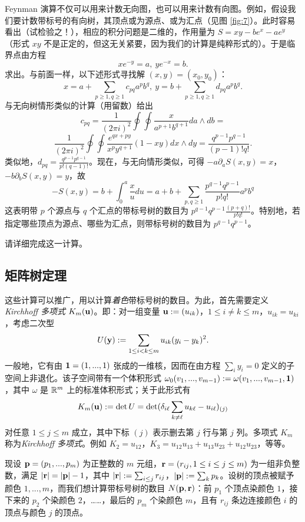 Feynman 演算不仅可以用来计数无向图，也可以用来计数有向图。例如，假设我们要计数带标号的有向树，其顶点或为源点、或为汇点（见图 \ref{fig:7}）。此时容易看出（试检验之！），相应的积分问题是二维的，作用量为 $S=xy-be^x-ae^y$（形式 $xy$ 不是正定的，但这无关紧要，因为我们的计算是纯粹形式的）。于是临界点由方程
$$
xe^{-y}=a,\ ye^{-x}=b.
$$
求出。与前面一样，以下述形式寻找解 $(x,y)=(x_0,y_0)$：
$$
x=a+\sum_{p\ge 1,q\ge 1} c_{pq}a^pb^q,\ y=b+\sum_{p\ge 1,q\ge 1} d_{pq}a^pb^q.
$$
与无向树情形类似的计算（用留数）给出
$$
c_{pq}=\frac{1}{(2\pi i)^2}\oint\oint\frac{x}{a^{p+1}b^{q+1}}da\wedge db=
$$
$$
\frac{1}{(2\pi i)^2}\oint\oint \frac{e^{qx+py}}{x^py^{q+1}}(1-xy)dx\wedge dy=
\frac{q^{p-1}p^{q-1}}{(p-1)!q!}.
$$
类似地，$d_{pq}=\frac{q^{p-1}p^{q-1}}{p!(q-1)!}$。现在，与无向情形类似，可得 $-a\partial_aS(x,y)=x$，$-b\partial_bS(x,y)=y$，故
$$
-S(x,y)=b+\int_0^a\frac{x}{u}du=
a+b+\sum_{p,q\ge 1}\frac{p^{q-1}q^{p-1}}{p!q!}a^pb^q
$$
这表明带 $p$ 个源点与 $q$ 个汇点的带标号树的数目为 $p^{q-1}q^{p-1}\frac{(p+q)!}{p!q!}$。特别地，若指定哪些顶点为源点、哪些为汇点，则带标号树的数目为 $p^{q-1}q^{p-1}$。

\begin{exercise} 请详细完成这一计算。
\end{exercise}

\subsection{矩阵树定理}

这些计算可以推广，用以计算\emph{着色}带标号树的数目。为此，首先需要定义\emph{Kirchhoff 多项式} $K_m(\bold u)$。即：对一组变量 $\bold u:=(u_{ik})$，$1\le i\ne k\le m$，$u_{ik}=u_{ki}$，考虑二次型
$$
U(\bold y):=\sum_{1\le i<k\le m}u_{ik}(y_i-y_k)^2.
$$
一般地，它有由 $\bold 1=(1,...,1)$ 张成的一维核，因而在由方程 $\sum_i y_i=0$ 定义的子空间上非退化。该子空间带有一个体积形式 $\omega_0(v_1,...,v_{m-1}):=\omega(v_1,...,v_{m-1},\bold 1)$，其中 $\omega$ 是 $\Bbb R^m$ 上的标准体积形式；关于此形式有
$$
K_m(\bold u):=\det U=\det(\delta_{i\ell}\sum_{k\ne \ell} u_{k\ell }-u_{i\ell})_{(j)}
$$
对任意 $1\le j\le m$ 成立，其中下标 $(j)$ 表示删去第 $j$ 行与第 $j$ 列。多项式 $K_m$ 称为\emph{Kirchhoff 多项式}。例如 $K_2=u_{12}$，$K_3=u_{12}u_{13}+u_{13}u_{23}+u_{12}u_{23}$，等等。

现设 $\bold p=(p_1,...,p_m)$ 为正整数的 $m$ 元组，$\bold r=(r_{ij},1\le i\le j\le m)$ 为一组非负整数，满足 $|\bold r|=|\bold p|-1$，其中 $|\bold r|:=\sum_{i\le j}r_{ij}$，$|\bold p|:=\sum_k p_k$。设树的顶点被赋予颜色 $1,...,m$，而我们想计算带标号树的数目 $N(\bold p,\bold r)$：前 $p_1$ 个顶点染颜色 $1$，接下来的 $p_2$ 个染颜色 $2$，……，最后的 $p_m$ 个染颜色 $m$，且有 $r_{ij}$ 条边连接颜色 $i$ 的顶点与颜色 $j$ 的顶点。


